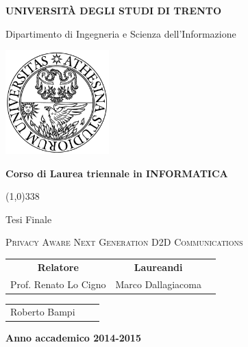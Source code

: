 \begin{titlepage}
  \pagestyle{empty}

  \begin{center}
    {\bfseries
      \Large {\huge U}NIVERSITÀ DEGLI STUDI DI {\huge T}RENTO}

    \vspace{0.2cm}

    {\Large Dipartimento di Ingegneria e Scienza dell'Informazione}

    \vspace{0.5cm}

    \begin{center}
      \includegraphics[width=0.3\textwidth]{img/logo_unitn.png}
    \end{center}

    \vspace{0.5cm}

    {\bfseries \Large Corso di Laurea triennale in INFORMATICA}

    \vspace{0.3cm}
    \line(1,0){338}
    \vspace{0.3cm}

    {\Large Tesi Finale}

    \vspace{2.5cm}

    {\huge \textsc{Privacy Aware Next Generation D2D Communications}\\}

    \vspace{3.0cm}

    \large
    \begin{center}
      \begin{tabular}{ccc}
        {\bfseries Relatore} &
        \hspace{5cm}
        {\bfseries Laureandi} \\

        Prof. Renato Lo Cigno &
        \hspace{5cm} Marco Dallagiacoma

      \end{tabular}
      
    \begin{tabular}{ccc}
        \hspace{10cm} Roberto Bampi

      \end{tabular}
    \end{center}
    \vspace{2cm}

    {\bfseries Anno accademico 2014-2015}
    \vfill
  \end{center}
\end{titlepage}
